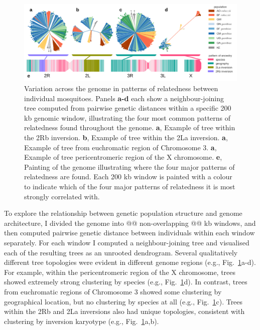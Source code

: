 \documentclass[a4paper,11pt,abstracton,hidelinks]{scrartcl}
\begin{document}
\begin{figure}[t!]
\centering
\includegraphics[width=\textwidth]{artwork/chapter4/treescan.pdf}
\caption{Variation across the genome in patterns of relatedness between individual mosquitoes.
%
Panels \textbf{a-d} each show a neighbour-joining tree computed from pairwise genetic distances within a specific 200 kb genomic window, illustrating the four most common patterns of relatedness found throughout the genome.
%
\textbf{a}, Example of tree within the 2Rb inversion.
%
\textbf{b}, Example of tree within the 2La inversion.
%
\textbf{a}, Example of tree from euchromatic region of Chromosome 3.
%
\textbf{a}, Example of tree pericentromeric region of the X chromosome.
%
\textbf{e}, Painting of the genome illustrating where the four major patterns of relatedness are found.
%
Each 200 kb window is painted with a colour to indicate which of the four major patterns of relatedness it is most strongly correlated with.
%
}
\label{fig:treescan}
\end{figure}


To explore the relationship between genetic population structure and genome architecture, I divided the genome into @@ non-overlapping @@ kb windows, and then computed pairwise genetic distance between individuals within each window separately.
%
For each window I computed a neighbour-joining tree and visualised each of the resulting trees as an unrooted dendrogram.
%
Several qualitatively different tree topologies were evident in different genome regions (e.g., Fig.~\ref{fig:treescan}a-d).
%
For example, within the pericentromeric region of the X chromosome, trees showed extremely strong clustering by species (e.g., Fig.~\ref{fig:treescan}d).
%
In contrast, trees from euchromatic regions of Chromosome 3 showed some clustering by geographical location, but no clustering by species at all (e.g., Fig.~\ref{fig:treescan}c).
%
Trees within the 2Rb and 2La inversions also had unique topologies, consistent with clustering by inversion karyotype (e.g., Fig.~\ref{fig:treescan}a,b).
%
\end{document}
